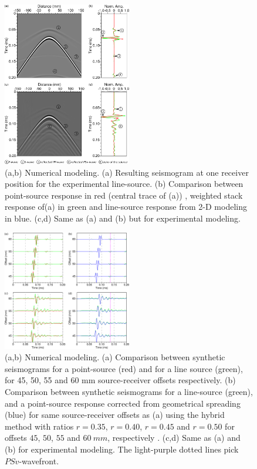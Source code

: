 \documentclass[manuscript,revised]{geophysics}
\newcommand{\twod}{2-D }
\begin{document}
\begin{figure}[!h]
	\centering
	\includegraphics[width=0.5\textwidth]{fig/amplitude_stack_principle.eps}
	\caption{(a,b) Numerical modeling. (a) Resulting seismogram at one receiver position for the experimental line-source. (b) Comparison between point-source response in red (central trace of (a)) , weighted stack response of(a) in green and line-source response from \twod modeling in blue. (c,d) Same as (a) and (b) but for experimental modeling.}
	\label{amplitude_stack_principle}
\end{figure}

\begin{figure}[!h]
	\centering
	\includegraphics[width=0.5\textwidth]{fig/trans2d3d.eps}
	\caption{(a,b) Numerical modeling. (a) Comparison between synthetic seismograms for a point-source (red) and for a line source (green), for 45, 50, 55 and 60 mm source-receiver offsets respectively. (b) Comparison between synthetic seismograms for a line-source (green), and a point-source response corrected from geometrical spreading (blue) for same source-receiver offsets as (a) using the hybrid method with ratios $r=0.35$, $r=0.40$, $r=0.45$ and $r=0.50$ for offsets $45$, $50$, $55$ and $60\ mm$, respectively . (c,d) Same as (a) and (b) for experimental modeling. The light-purple dotted lines pick $PSv$-wavefront.}%
	\label{panel_amplitude_sem}
\end{figure}
\end{document}
